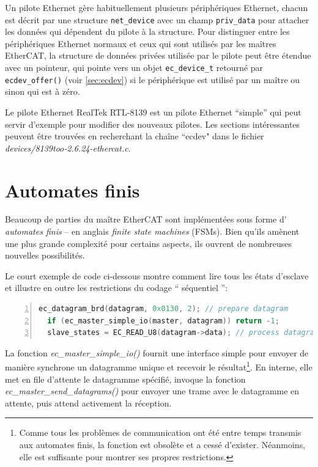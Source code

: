 \documentclass[a4paper,12pt,BCOR6mm,bibtotoc,idxtotoc]{scrbook}
\begin{document}
Un pilote Ethernet g\`ere habituellement plusieurs p\'eriph\'eriques
Ethernet, chacun est d\'ecrit par une structure \lstinline+net_device+
avec un champ \lstinline+priv_data+ pour attacher les donn\'ees qui
d\'ependent du pilote \`a la structure. Pour distinguer entre les
p\'eriph\'eriques Ethernet normaux et ceux qui sont utilis\'es par les
ma\^itres EtherCAT, la structure de donn\'ees priv\'ees utilis\'ee par
le pilote peut \^etre \'etendue avec un pointeur, qui pointe vers un
objet \lstinline+ec_device_t+ retourn\'e par
\lstinline+ecdev_offer()+ (voir \autoref{sec:ecdev}) si le
p\'eriph\'erique est utilis\'e par un ma\^itre ou sinon qui est \`a
z\'ero.

Le pilote Ethernet RealTek RTL-8139 est un pilote Ethernet ``simple''
qui peut servir d'exemple pour modifier des nouveaux pilotes.  Les
sections int\'eressantes peuvent \^etre trouv\'ees en recherchant la
cha\^ine ``ecdev" dans le fichier
\textit{devices/8139too-2.6.24-ethercat.c}.


\chapter{Automates finis}
\label{sec:fsm}

Beaucoup de parties du ma\^itre EtherCAT sont impl\'ement\'ees sous
forme d' \textit{automates finis} -- en anglais \textit{finite state
  machines} (FSMs). Bien
qu'ils am\`enent une plus grande complexit\'e pour certains aspects,
ils ouvrent de nombreuses nouvelles possibilit\'es.

Le court exemple de code ci-dessous montre comment lire tous les \'etats
d'esclave et illustre en outre les restrictions du codage ``
s\'equentiel '':


\begin{lstlisting}[gobble=2,language=C,numbers=left]
  ec_datagram_brd(datagram, 0x0130, 2); // prepare datagram
  if (ec_master_simple_io(master, datagram)) return -1;
  slave_states = EC_READ_U8(datagram->data); // process datagram
\end{lstlisting}

La fonction \textit{ec\_master\_simple\_io()} fournit une interface
simple pour envoyer de mani\`ere synchrone un datagramme unique et
recevoir le r\'esultat\footnote{ Comme tous les probl\`emes de
  communication ont \'et\'e entre temps transmis aux automates finis,
  la fonction est obsol\`ete et a cess\'e d'exister. N\'eanmoins, elle
  est suffisante pour montrer ses propres restrictions. }.  En
interne, elle met en file d'attente le datagramme sp\'ecifi\'e,
invoque la fonction \textit{ec\_master\_send\_datagrams()} pour
envoyer une trame avec le datagramme en attente, puis attend
activement la r\'eception.
\end{document}

